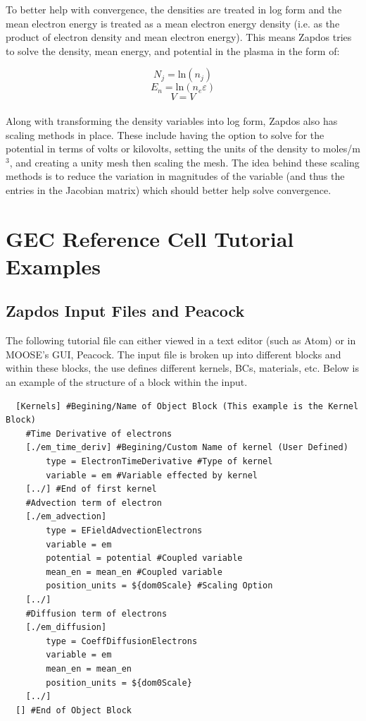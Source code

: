 \documentclass[final]{report}
\begin{document}
  To better help with convergence, the densities are treated in log form and the mean electron energy is treated as a mean electron energy density (i.e. as the product of electron density and mean electron energy). This means Zapdos tries to solve the density, mean energy, and potential in the plasma in the form of:

  \begin{equation}
      N_{j} = \text{ln} (n_{j})
  \end{equation}
  \begin{equation}
      E_{n} = \text{ln} (n_{e}\varepsilon)
  \end{equation}
  \begin{equation}
      V = V
  \end{equation}
  \\
  Along with transforming the density variables into log form, Zapdos also has scaling methods in place. These include having the option to solve for the potential in terms of volts or kilovolts, setting the units of the density to moles/m$^3$, and creating a unity mesh then scaling the mesh. The idea behind these scaling methods is to reduce the variation in magnitudes of the variable (and thus the entries in the Jacobian matrix) which should better help solve convergence.

  \chapter{GEC Reference Cell Tutorial Examples} \label{chapter4}

  \section{Zapdos Input Files and Peacock}

  The following tutorial file can either viewed in a text editor (such as Atom) or in MOOSE's GUI, Peacock. The input file is broken up into different blocks and within these blocks, the use defines different kernels, BCs, materials, etc. Below is an example of the structure of a block within the input.

  \begin{verbatim}
  [Kernels] #Begining/Name of Object Block (This example is the Kernel Block)
    #Time Derivative of electrons
    [./em_time_deriv] #Begining/Custom Name of kernel (User Defined)
        type = ElectronTimeDerivative #Type of kernel
        variable = em #Variable effected by kernel
    [../] #End of first kernel
    #Advection term of electron
    [./em_advection]
        type = EFieldAdvectionElectrons
        variable = em
        potential = potential #Coupled variable
        mean_en = mean_en #Coupled variable
        position_units = ${dom0Scale} #Scaling Option
    [../]
    #Diffusion term of electrons
    [./em_diffusion]
        type = CoeffDiffusionElectrons
        variable = em
        mean_en = mean_en
        position_units = ${dom0Scale}
    [../]
  [] #End of Object Block
  \end{verbatim}
\end{document}
